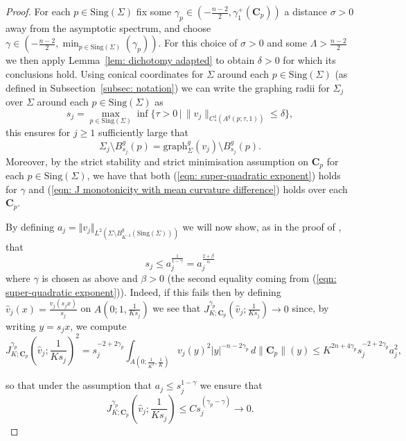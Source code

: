 \documentclass[12pt]{article}
\begin{document}
\begin{proof}
    \bigskip

    For each $p \in \mathrm{Sing}(\Sigma)$ fix some $\gamma_p\in(-\frac{n-2}{2},\gamma_1^+(\mathbf C_p))$ a distance $\sigma > 0$ away from the asymptotic spectrum, and choose $\gamma \in (-\frac{n-2}{2},\min_{p \in \mathrm{Sing}(\Sigma)}(\gamma_p))$. For this choice of $\sigma > 0$ and some $\Lambda > \frac{n-2}{2}$ we then apply Lemma~\ref{lem: dichotomy adapted} to obtain $\delta>0$ for which its conclusions hold. Using conical coordinates for $\Sigma$ around each $p \in \mathrm{Sing}(\Sigma)$ (as defined in Subsection~\ref{subsec: notation}) we can write the graphing radii for $\Sigma_j$ over $\Sigma$ around each $p \in \mathrm{Sing}(\Sigma)$ as
    $$
         s_j = \max_{p \in \mathrm{Sing}(\Sigma)}\inf \{ \tau>0 \, | \, \|v_j\|_{C^1_*(A^g(p;\tau,1))}\le \delta\},
     $$
    this ensures for $j \geq 1$ sufficiently large that
        $$\Sigma_j \setminus B_{s_j}^g(p) = \mathrm{graph}_{\Sigma}^g(v_j) \setminus B_{s_j}^g(p).$$ 
    Moreover, by the strict stability and strict minimisation assumption on $\mathbf{C}_p$ for each $p \in \mathrm{Sing}(\Sigma)$, we have that both (\ref{eqn: super-quadratic exponent}) holds for $\gamma$ and (\ref{eqn: J monotonicity with mean curvature difference}) holds over each $\mathbf{C}_p$. 

    \bigskip
    
    By defining $a_j = \Vert v_j\Vert_{L^2(\Sigma \setminus B_{K^{-2}}^g(\mathrm{Sing}(\Sigma)))}$ we will now show, as in the proof of \cite[Theorem 4]{MNP25}, that 
    \begin{equation}\label{eqn: graphing radius estimate}
    s_j \leq a_j^{\frac{1}{1-\gamma}} = a_j^\frac{2 + \beta}{n}
    \end{equation}
    where $\gamma$ is chosen as above and $\beta > 0$ (the second equality coming from (\ref{eqn: super-quadratic exponent})). Indeed, if this fails then by defining $\hat{v}_j(x) = \frac{v_j(s_j x)}{s_j}$ on $A(0;1,\frac{1}{Ks_j})$ we see that $J^{\gamma_p}_{K;\mathbf{C}_p}\left(\hat{v}_j;\frac{1}{Ks_j}\right) \rightarrow 0$ since, by writing $y = s_jx$, we compute
    $$J^{\gamma_p}_{K;\mathbf{C}_p}\left(\hat{v}_j;\frac{1}{Ks_j}\right)^2 = s_j^{-2+2\gamma_p} \int_{A\left(0;\frac{1}{K^2},\frac{1}{K}\right)} v_j(y)^2|y|^{-n-2\gamma_p} \, d\|\mathbf{C}_p\|(y) \leq K^{2n + 4\gamma_p}s_j^{-2+2\gamma_p} a_j^2,$$
    
    so that under the assumption that $a_j \leq s_j^{1-\gamma}$ we ensure that
    $$J^{\gamma_p}_{K;\mathbf{C}_p}\left(\hat{v}_j;\frac{1}{Ks_j}\right) \leq Cs_j^{(\gamma_p - \gamma)} \rightarrow 0.$$
    

\end{proof}
\end{document}
